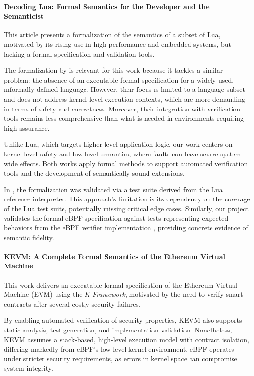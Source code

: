 \documentclass[sigconf]{acmart}
\begin{document}
\paragraph{Decoding Lua: Formal Semantics for the Developer and the Semanticist}\cite{soldevila2017decoding} This article presents a formalization of the semantics of a subset of Lua, motivated by its rising use in high-performance and embedded systems, but lacking a formal specification and validation tools.

The formalization by \cite{soldevila2017decoding} is relevant for this work because it tackles a similar problem: the absence of an executable formal specification for a widely used, informally defined language. However, their focus is limited to a language subset and does not address kernel-level execution contexts, which are more demanding in terms of safety and correctness. Moreover, their integration with verification tools remains less comprehensive than what is needed in environments requiring high assurance.

Unlike Lua, which targets higher-level application logic, our work centers on kernel-level safety and low-level semantics, where faults can have severe system-wide effects. Both works apply formal methods to support automated verification tools and the development of semantically sound extensions.

In \cite{soldevila2017decoding}, the formalization was validated via a test suite derived from the Lua reference interpreter. This approach's limitation is its dependency on the coverage of the Lua test suite, potentially missing critical edge cases. Similarly, our project validates the formal eBPF specification against tests representing expected behaviors from the eBPF verifier implementation \cite{ubpf}, providing concrete evidence of semantic fidelity.

\paragraph{KEVM: A Complete Formal Semantics of the Ethereum Virtual Machine}\cite{hildenbrandt2018kevm} This work delivers an executable formal specification of the Ethereum Virtual Machine (EVM) using the \textit{K Framework}, motivated by the need to verify smart contracts after several costly security failures.

By enabling automated verification of security properties, KEVM also supports static analysis, test generation, and implementation validation. Nonetheless, KEVM assumes a stack-based, high-level execution model with contract isolation, differing markedly from eBPF's low-level kernel environment. eBPF operates under stricter security requirements, as errors in kernel space can compromise system integrity.
\end{document}
